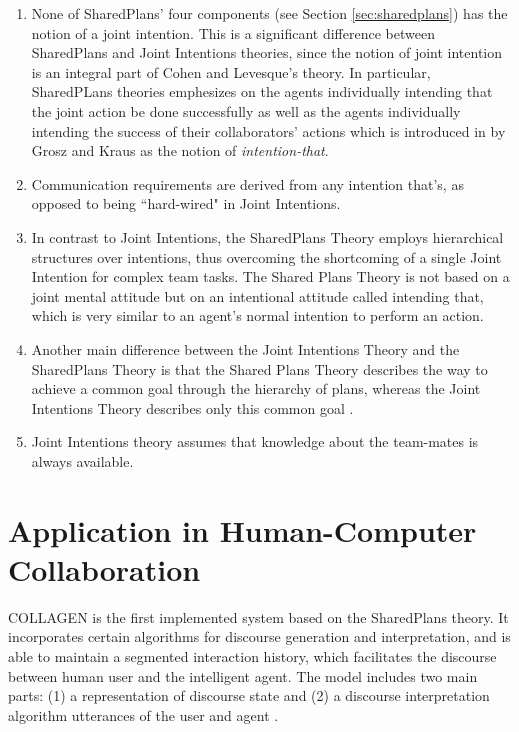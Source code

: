 \documentclass[11pt]{article}
\begin{document}
\begin{enumerate}
  \item None of SharedPlans' four components (see Section \ref{sec:sharedplans})
  has the notion of a joint intention. This is a significant difference between
  SharedPlans and Joint Intentions theories, since the notion of joint intention
  is an integral part of Cohen and Levesque's theory. In particular, SharedPLans
  theories emphesizes on the agents individually intending that the joint action
  be done successfully as well as the agents individually intending the success
  of their collaborators' actions which is introduced in
  \cite{grosz:collaboration} by Grosz and Kraus as the notion of
  \textit{intention-that}.
  \item Communication requirements are derived from any intention that's, as
  opposed to being ``hard-wired" in Joint Intentions.
  \item In contrast to Joint Intentions, the SharedPlans Theory employs
  hierarchical structures over intentions, thus overcoming the shortcoming of a
  single Joint Intention for complex team tasks. The Shared Plans Theory is not
  based on a joint mental attitude but on an intentional attitude called
  intending that, which is very similar to an agent’s normal intention to
  perform an action.
  \item Another main difference between the Joint Intentions Theory and the
  SharedPlans Theory is that the Shared Plans Theory describes the way to
  achieve a common goal through the hierarchy of plans, whereas the Joint
  Intentions Theory describes only this common goal
  \cite{skubch:modelling-behavior-robots}.
  \item Joint Intentions theory assumes that knowledge about the team-mates is
  always available.
\end{enumerate}

\section{Application in Human-Computer Collaboration}
\label{sec:applicaiton}

COLLAGEN \cite{rich:collaboration-manager,rich:discourse} is the first
implemented system based on the SharedPlans theory. It incorporates certain
algorithms for discourse generation and interpretation, and is able to maintain
a segmented interaction history, which facilitates the discourse between human
user and the intelligent agent. The model includes two main parts: (1) a
representation of discourse state and (2) a discourse interpretation algorithm
utterances of the user and agent \cite{rickel:discourse-theory-dialogue}.
\end{document}
